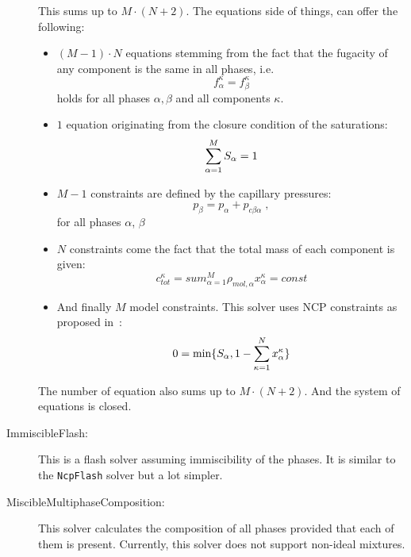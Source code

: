 \begin{description}
\begin{itemize}
  \end{itemize}
  This sums up to $M\cdot(N + 2)$. The equations side of things, can
  offer the following:
  \begin{itemize}
  \item $(M - 1)\cdot N$ equations stemming from the fact that the
    fugacity of any component is the same in all phases, i.e.
    \[
    f^\kappa_\alpha = f^\kappa_\beta
    \]
    holds for all phases $\alpha, \beta$ and all components $\kappa$.
  \item $1$ equation originating from the closure condition of the saturations:
    \[
    \sum_{\alpha=1}^M S_\alpha = 1
    \]
  \item $M - 1$ constraints are defined by the capillary pressures:
    \[ 
    p_\beta = p_\alpha + p_{c\beta\alpha} \;,
    \]
    for all phases $\alpha$, $\beta$
  \item $N$ constraints come  the fact that the total mass of each
    component is given:
    \[
    c^\kappa_{tot} = sum_{\alpha=1}^M \rho_{mol,\alpha} x_\alpha^\kappa = const
    \]
  \item And finally $M$ model constraints. This solver uses NCP
    constraints as proposed in~\cite{LHHW2011}:
    \[
     0 = \mathrm{min}\{S_\alpha, 1 - \sum_{\kappa=1}^N x_\alpha^\kappa\}
   \]
\end{itemize}

The number of equation also sums up to $M\cdot(N + 2)$. And the system
of equations is closed.
\item[ImmiscibleFlash:] This is a flash solver assuming
  immiscibility of the phases. It is similar to the \texttt{NcpFlash}
  solver but a lot simpler.
\item[MiscibleMultiphaseComposition:] This solver calculates
  the composition of all phases provided that each of them is
  present. Currently, this solver does not support non-ideal mixtures.
\end{description}

